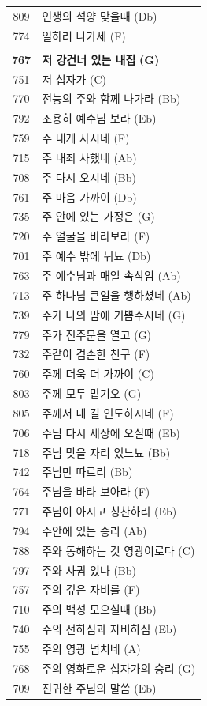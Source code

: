 \begin{supertabular}{c l}
809 & 인생의 석양 맞을때 (Db) \\
774 & 일하러 나가세 (F) \\
 & \\
\textbf{767} & \textbf{저 강건너 있는 내집} \textbf{(G)} \\
751 & 저 십자가 (C) \\
770 & 전능의 주와 함께 나가라 (Bb) \\
792 & 조용히 예수님 보라 (Eb) \\
759 & 주 내게 사시네 (F) \\
715 & 주 내죄 사했네 (Ab) \\
708 & 주 다시 오시네 (Bb) \\
761 & 주 마음 가까이 (Db) \\
735 & 주 안에 있는 가정은 (G) \\
720 & 주 얼굴을 바라보라 (F) \\
701 & 주 예수 밖에 뉘뇨 (Db) \\
763 & 주 예수님과 매일 속삭임 (Ab) \\
713 & 주 하나님 큰일을 행하셨네 (Ab) \\
739 & 주가 나의 맘에 기쁨주시네 (G) \\
779 & 주가 진주문을 열고 (G) \\
732 & 주같이 겸손한 친구 (F) \\
760 & 주께 더욱 더 가까이 (C) \\
803 & 주께 모두 맡기오 (G) \\
805 & 주께서 내 길 인도하시네 (F) \\
706 & 주님 다시 세상에 오실때 (Eb) \\
718 & 주님 맞을 자리 있느뇨 (Bb) \\
742 & 주님만 따르리 (Bb) \\
764 & 주님을 바라 보아라 (F) \\
771 & 주님이 아시고 칭찬하리 (Eb) \\
794 & 주안에 있는 승리 (Ab) \\
788 & 주와 동해하는 것 영광이로다 (C) \\
797 & 주와 사귐 있나 (Bb) \\
757 & 주의 깊은 자비를 (F) \\
710 & 주의 백성 모으실때 (Bb) \\
740 & 주의 선하심과 자비하심 (Eb) \\
755 & 주의 영광 넘치네 (A) \\
768 & 주의 영화로운 십자가의 승리 (G) \\
709 & 진귀한 주님의 말씀 (Eb) \\

\end{supertabular}
